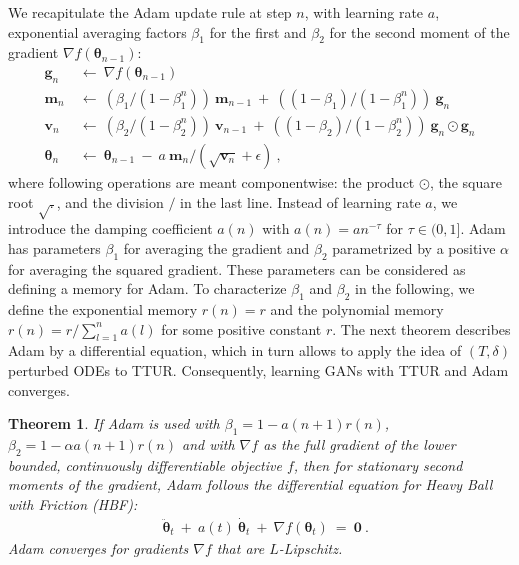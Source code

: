 \documentclass{article}
\newtheorem{theorem}{Theorem}
\newcommand\Bg{\bm{g}}
\newcommand\Bm{\bm{m}}
\newcommand\Bv{\bm{v}}
\newcommand\Bth{\bm{\theta}}
\newcommand\BZe{\bm{0}}
\begin{document}
We recapitulate the Adam update rule at step $n$, with learning rate $a$,
exponential averaging factors $\beta_1$ for the first and $\beta_2$
for the second moment of the gradient $\nabla f(\Bth_{n-1})$:
\begin{align}
\label{eq:adam}
\Bg_n \ &\longleftarrow \  \nabla f(\Bth_{n-1}) \\ \nonumber
\Bm_n \ &\longleftarrow \ (\beta_1/(1-\beta_1^n)) \ \Bm_{n-1} \ + \
((1-\beta_1)/(1-\beta_1^n)) \ \Bg_n \\ \nonumber
\Bv_n \ &\longleftarrow \ (\beta_2/(1-\beta_2^n)) \ \Bv_{n-1} \ + \
          ((1-\beta_2)/(1-\beta_2^n)) \ \Bg_n \odot \Bg_n \\ \nonumber
\Bth_n \ &\longleftarrow \ \Bth_{n-1} \ - \ a \ \Bm_n /(\sqrt{\Bv_n}+\epsilon)
\ ,
\end{align}
where following operations are meant componentwise:
the product $\odot$,
the square root $\sqrt{.}$, and
the division $/$ in the last line.
Instead of learning rate $a$, we introduce the damping
coefficient $a(n)$ with $a(n)=a n^{-\tau}$ for $\tau \in (0,1]$.
Adam has parameters $\beta_1$ for averaging the
gradient and $\beta_2$ parametrized by a positive $\alpha$ for
averaging the squared gradient.
These parameters can be considered as defining a memory for Adam.
To characterize $\beta_1$ and $\beta_2$ in the following, we define
the exponential memory $r(n)=r$  and
the polynomial memory $r(n)=r/\sum_{l=1}^{n} a(l)$ for some positive
constant $r$. The next theorem describes Adam by a differential
equation, which in turn allows to apply the idea of
$(T,\delta)$ perturbed ODEs to TTUR.
Consequently, learning GANs with TTUR and
Adam converges.
\begin{theorem}
\label{th:adam}
If Adam is used with $\beta_1=1-a(n+1)r(n)$,
$\beta_2=1-\alpha a(n+1)r(n)$
and with $\nabla f$ as the full gradient of the lower bounded,
continuously differentiable objective $f$,
then for stationary second moments of the gradient,
Adam follows the differential equation
for Heavy Ball with Friction (HBF):
\begin{align}
\label{eq:Diff}
&\ddot{\Bth}_t \ + \ a(t) \ \dot{\Bth}_t \ + \ \nabla f(\Bth_t)
\ = \ \BZe  \ .
\end{align}
Adam converges for gradients $\nabla f$ that are $L$-Lipschitz.
\end{theorem}
\end{document}
